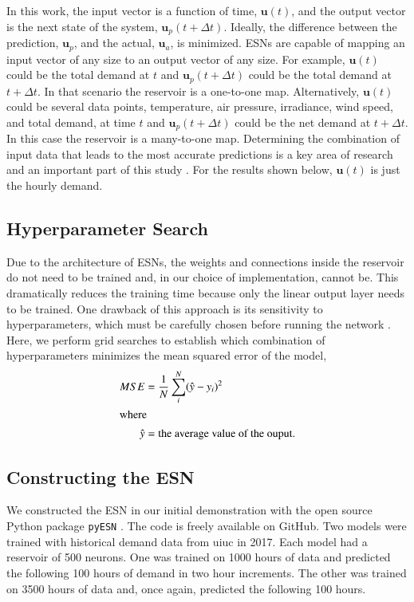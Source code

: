 In this
work, the input vector is a function of time, $\bm{u}(t)$, and the output
vector is the next state of the system, $\bm{u}_p(t+\Delta t)$. Ideally, the
difference between the prediction, $\bm{u}_p$, and the actual, $\bm{u}_a$, is
minimized. \glspl{ESN} are capable of mapping an input vector of any size to
an output vector of any size. For example, $\bm{u}(t)$ could be the total
demand
at $t$ and $\bm{u}_p(t+\Delta t)$ could be the total demand at $t+\Delta t$. In
that scenario the reservoir is a one-to-one map. Alternatively, $\bm{u}(t)$
could be several data points, temperature, air pressure, irradiance, wind
speed, and total demand, at time $t$ and $\bm{u}_p(t+\Delta t)$ could be the
net demand at $t+\Delta t$. In this case the reservoir is a many-to-one map.
Determining the combination of input data that leads to the most accurate
predictions is a key area of research and an important part of this study
\cite{kobylinski_high-resolution_2020,bianchi_reservoir_2020}. For the results
shown below, $\bm{u}(t)$ is just the hourly demand.

\subsection{\textbf{Hyperparameter Search}}
Due to the architecture of \glspl{ESN}, the weights and connections
inside the reservoir do not need to be trained and, in our choice of
implementation, cannot be. This dramatically reduces the training time because
only the linear output layer needs to be trained. One drawback of this approach
is its sensitivity to hyperparameters, which must be carefully chosen before
running the network \cite{ pathak_model-free_2018,
lukosevicius_practical_2012, lukosevicius_reservoir_2009,gallicchio_deep_2019}.
Here, we perform grid searches
to establish which combination of hyperparameters minimizes the mean squared
error of the model,
\begin{align}
	MSE &= \frac{1}{N}\sum_i^N (\hat{y} - y_i)^2\\
	\intertext{where}
	\hat{y} &= \mbox{the average value of the ouput.}\nonumber
\end{align}

\subsection{\textbf{Constructing the \gls{ESN}}}

We constructed the \gls{ESN} in our initial demonstration with the open source
Python package \texttt{pyESN} \cite{korndorfer_pyesn_2015}. The code
is freely available on GitHub. Two models were trained with
historical demand data from \gls{uiuc} in 2017.  Each model had a
reservoir of 500 neurons. One was trained on 1000 hours of
data and predicted the following 100 hours of demand in two hour
increments. The other was trained on 3500 hours of data and, once again,
predicted the following 100 hours.

